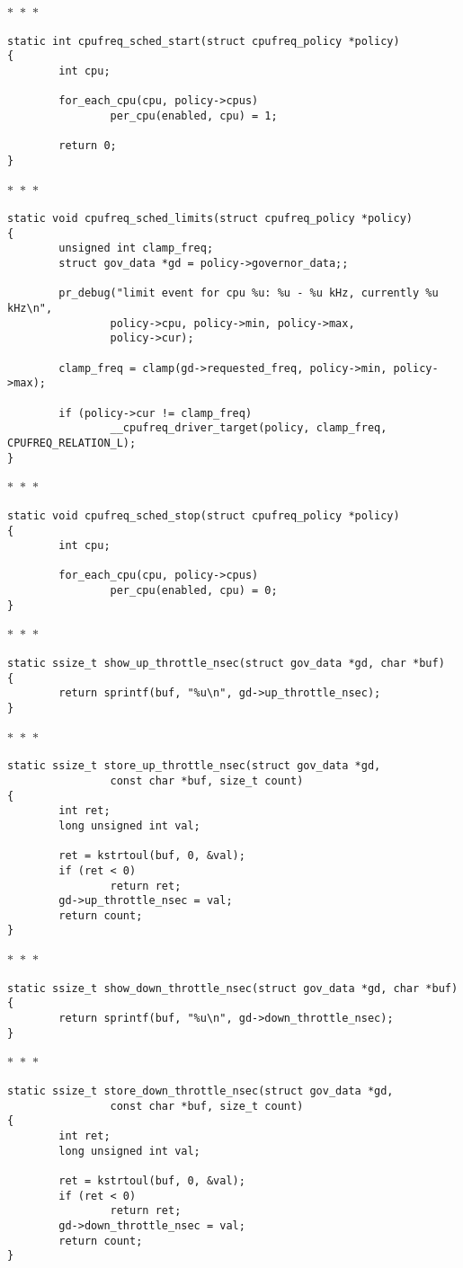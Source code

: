 \documentclass{article}
\newcommand{\divider}{{\begin{center}
  $\ast$~$\ast$~$\ast$
\end{center}}}
\begin{document}
\divider
\begin{verbatim}
static int cpufreq_sched_start(struct cpufreq_policy *policy)
{
        int cpu;

        for_each_cpu(cpu, policy->cpus)
                per_cpu(enabled, cpu) = 1;

        return 0;
}
\end{verbatim}
\divider
\begin{verbatim}
static void cpufreq_sched_limits(struct cpufreq_policy *policy)
{
        unsigned int clamp_freq;
        struct gov_data *gd = policy->governor_data;;

        pr_debug("limit event for cpu %u: %u - %u kHz, currently %u kHz\n",
                policy->cpu, policy->min, policy->max,
                policy->cur);

        clamp_freq = clamp(gd->requested_freq, policy->min, policy->max);

        if (policy->cur != clamp_freq)
                __cpufreq_driver_target(policy, clamp_freq, CPUFREQ_RELATION_L);
}
\end{verbatim}
\divider
\begin{verbatim}
static void cpufreq_sched_stop(struct cpufreq_policy *policy)
{
        int cpu;

        for_each_cpu(cpu, policy->cpus)
                per_cpu(enabled, cpu) = 0;
}
\end{verbatim}
\divider
\begin{verbatim}
static ssize_t show_up_throttle_nsec(struct gov_data *gd, char *buf)
{
        return sprintf(buf, "%u\n", gd->up_throttle_nsec);
}
\end{verbatim}
\divider
\begin{verbatim}
static ssize_t store_up_throttle_nsec(struct gov_data *gd,
                const char *buf, size_t count)
{
        int ret;
        long unsigned int val;

        ret = kstrtoul(buf, 0, &val);
        if (ret < 0)
                return ret;
        gd->up_throttle_nsec = val;
        return count;
}
\end{verbatim}
\divider
\begin{verbatim}
static ssize_t show_down_throttle_nsec(struct gov_data *gd, char *buf)
{
        return sprintf(buf, "%u\n", gd->down_throttle_nsec);
}
\end{verbatim}
\divider
\begin{verbatim}
static ssize_t store_down_throttle_nsec(struct gov_data *gd,
                const char *buf, size_t count)
{
        int ret;
        long unsigned int val;

        ret = kstrtoul(buf, 0, &val);
        if (ret < 0)
                return ret;
        gd->down_throttle_nsec = val;
        return count;
}
\end{verbatim}
\end{document}
